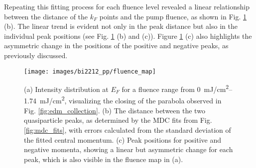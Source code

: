 Repeating this fitting process for each fluence level revealed a linear relationship between the distance of the $k_F$ points and the pump fluence, as shown in Fig. \ref{fig:fluence_map} (b).
The linear trend is evident not only in the peak distance but also in the individual peak positions (see Fig. \ref{fig:fluence_map} (b) and (c)). Figure \ref{fig:fluence_map} (c) also highlights the asymmetric change in the positions of the positive and negative peaks, as previously discussed.

\begin{figure}[th!]
	\centering
	\texttt{[image: images/bi2212\_pp/fluence\_map]}
	\caption{(a) Intensity distribution at $E_F$ for a fluence range from \qtyrange{0}{1.74}{\milli\joule/\centi\meter\squared}, visualizing the closing of the parabola observed in Fig. \ref{fig:edm_collection}. (b) The distance between the two quasiparticle peaks, as determined by the MDC fits from Fig. \ref{fig:mdc_fits}, with errors calculated from the standard deviation of the fitted central momentum. (c) Peak positions for positive and negative momenta, showing a linear but asymmetric change for each peak, which is also visible in the fluence map in (a).}
	\label{fig:fluence_map}
\end{figure}

